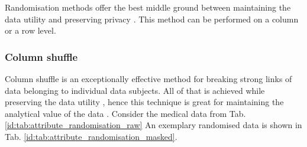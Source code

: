 \documentclass[a4paper,twoside,12pt]{book}
\begin{document}
Randomisation methods offer the best middle ground between maintaining the data utility and preserving privacy \cite{bib:data_shuffling}. This method can be performed on a column or a row level.

\subsubsection{Column shuffle}

Column shuffle is an exceptionally effective method for breaking strong links of data belonging to individual data subjects. All of that is achieved while preserving the data utility \cite{bib:gdpr_handbook}, hence this technique is great for maintaining the analytical value of the data \cite{bib:data_shuffling}.
%
Consider the medical data from Tab. \ref{id:tab:attribute_randomisation_raw}
%
%
An exemplary randomised data is shown in Tab. \ref{id:tab:attribute_randomisation_masked}.
%
%
\end{document}
